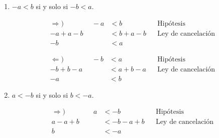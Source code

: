 \documentclass[11pt]{article}
\begin{document}
\begin{enumerate}[label=\alph*)]
\begin{enumerate}[label=\roman*)]
\begin{center}
\begin{minipage}[r]{.5\linewidth}
        \end{minipage}
        \end{center}
        \item $-a<b$ si y solo si $-b<a$.
        \begin{center}\vspace{-1em}
        \begin{minipage}[l]{.5\linewidth}
            \begin{align*}
                \Rightarrow) \qquad \qquad -a &< b && \text{Hipótesis}\\
                -a+a-b &< b +a-b && \text{Ley de cancelación}\\
                -b &< a%
            \end{align*}
        \end{minipage}%
        \begin{minipage}[r]{.5\linewidth}
            \begin{align*}
                \Leftarrow) \qquad \qquad   -b &< a && \text{Hipótesis}\\
                -b + b-a &< a + b-a && \text{Ley de cancelación}\\
                -a &< b%
            \end{align*}
        \end{minipage}
        \end{center}
        \item $a<-b$ si y solo si $b<-a$.
        \begin{center}\vspace{-1em}
        \begin{minipage}[l]{.5\linewidth}
            \begin{align*}
                \Rightarrow) \qquad \qquad
                a &< -b && \text{Hipótesis}\\
                a - a + b &< -b -a +b && \text{Ley de cancelación}\\
                b &< -a%
            \end{align*}
        \end{minipage}%

\end{center}
\end{enumerate}
\end{enumerate}
\end{document}
